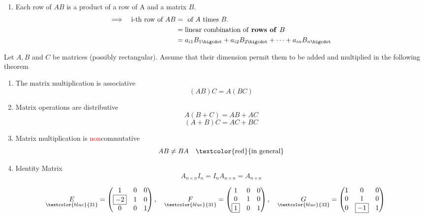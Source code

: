 \begin{enumerate}[label=(\arabic*)]
    \item Each row of $AB$ is a product of a row of A and a matrix $B$.
    \begin{align*}
    \Longrightarrow \quad \text{i-th row of }AB &= \textbf{ } \text{of } A \text{ times } B.\\
    &= \text{linear combination of \textbf{rows of }}B \\
    &= a_{i1}B_{1\bigcdot} + a_{i2}B_{2\bigcdot} + \cdots + a_{in}B_{n\bigcdot}
    \end{align*}
    
\end{enumerate}

\begin{theorem}
    Let $A, B$ and $C$ be matrices (possibly rectangular). Assume that their dimension permit them to be added and multiplied in the following theorem
    \begin{enumerate}[label=(\arabic*)]
        \item The matrix multiplication is associative
        \[
        (AB)C = A(BC)
        \]
        
        \item Matrix operations are distributive
        \[
        A(B+C) = AB + AC
        \]
        \[
        (A+B)C = AC + BC
        \]

        \item Matrix multiplication is \textcolor{red}{non}commutative
        \[
        AB \neq BA \quad \text{\textcolor{red}{in general}}
        \]

        \item Identity Matrix
        \[
        A_{n\times n} I_n = I_n A_{n\times n} = A_{n\times n}
        \]
    \end{enumerate}
\end{theorem}

\begin{eg}
\[
\underset{\textcolor{blue}{\text{21}}}{E} = \left(\begin{matrix}
    1 & 0 & 0\\
    \boxed{-2} & 1 & 0\\
    0 & 0 & 1
\end{matrix}\right), \quad 
\underset{\textcolor{blue}{\text{31}}}{F} = \left(\begin{matrix}
    1 & 0 & 0\\
    0 & 1 & 0\\
    \boxed{1} & 0 & 1
\end{matrix}\right), \quad 
\underset{\textcolor{blue}{\text{32}}}{G} = \left(\begin{matrix}
    1 & 0 & 0\\
    0 & 1 & 0\\
    0 & \boxed{-1} & 1
\end{matrix}\right)
\]
\end{eg}

